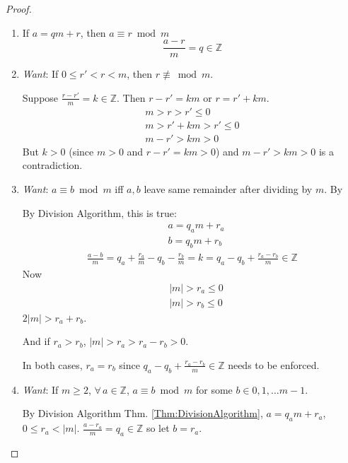 \documentclass[10pt]{amsart}
\begin{document}
\begin{multicols*}{2}
\begin{proof}
\begin{enumerate}
	\item If $a=qm +r$, then $a \equiv r \bmod{m}$ 
	\[
	\frac{a-r}{m} = q \in \mathbb{Z}  
	\]
	\item  \emph{Want}: If $0\leq r' <r <m$, then $r \not\equiv\bmod{m}$.  
	
	Suppose $\frac{r-r'}{m} = k \in \mathbb{Z}$.  Then $r-r' = km$ or $r=r' + km$.  
	\[
	\begin{gathered}
	m > r > r' \leq 0 \\
	m > r' + km > r' \leq 0 \\
	m-r' > km > 0 
	\end{gathered}
	\]
	But $k>0$ (since $m>0$ and $r-r' = km >0$) and $m-r' > km > 0$ is a contradiction.  
	
	\item \emph{Want}: $a \equiv b \bmod{m}$ iff $a,b$ leave same remainder after dividing by $m$.  By 
	
	By Division Algorithm, this is true: 
	\[
	\begin{aligned}
	& a=q_a m + r_a \\ 
	 & b= q_b m + r_b 
	\end{aligned}
	\] 
	\[
	\begin{gathered}
	\frac{a-b}{m} = q_a + \frac{r_a}{m} - q_b - \frac{r_b}{m} = k = q_a - q_b + \frac{r_a - r_b}{m} \in \mathbb{Z}
	\end{gathered}
	\]
	Now 
	\[
	\begin{aligned}
	& |m| > r_a \leq 0 \\ 
	& |m| > r_b \leq 0 
	\end{aligned}
		\]
		$2|m| > r_a + r_b$.  
		
		And if $r_a > r_b$, $|m| > r_a > r_a -r_b > 0$.  
		
		In both cases, $r_a=r_b$ since $q_a - q_b + \frac{r_a - r_b}{m} \in \mathbb{Z}$ needs to be enforced.   
		
	\item \emph{Want}: If $m\geq 2$, $\forall \, a \in \mathbb{Z}$, $a \equiv b \bmod{m}$ for some $b\in 0,1,\dots m-1$.  
	
	By Division Algorithm Thm. \ref{Thm:DivisionAlgorithm}, $a = q_a m + r_a$, \, $0 \leq r_a < |m|$.  $\frac{a-r_a}{m} = q_a \in \mathbb{Z}$ so let $b= r_a$.  
	
\end{enumerate}	
\end{proof}


\end{multicols*}
\end{document}
